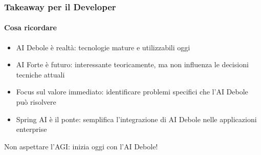%
\begin{frame}[t,fragile] \frametitle{Takeaway per il Developer}
	{\small
		\framesubtitle{Cosa ricordare}
		\begin{itemize}[leftmargin=10pt,align=right]
			\item[\alert{\faHandORight}] \alert{AI Debole è realtà:} tecnologie mature e utilizzabili oggi
			\item[\alert{\faHandORight}] \alert{AI Forte è futuro:} interessante teoricamente, ma non influenza le decisioni tecniche attuali
			\item[\alert{\faHandORight}] \alert{Focus sul valore immediato:} identificare problemi specifici che l'AI Debole può risolvere
			\item[\alert{\faHandORight}] \alert{Spring AI è il ponte:} semplifica l'integrazione di AI Debole nelle applicazioni enterprise
		\end{itemize}
		\vspace*{.5cm}
		\begin{center}
			\alert{\Large Non aspettare l'AGI: inizia oggi con l'AI Debole!}
		\end{center}
	}
\end{frame}
%
